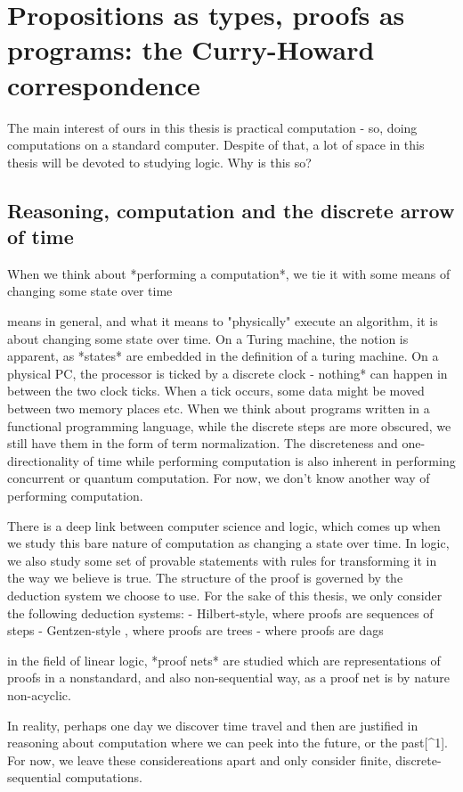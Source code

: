 \chapter{Propositions as types, proofs as programs: the Curry-Howard correspondence}
\label{chap:curry-howard}

The main interest of ours in this thesis is practical computation - so, doing computations
on a standard computer. Despite of that, a lot of space in this thesis will be devoted to 
studying logic. Why is this so?


\section{Reasoning, computation and the discrete arrow of time}
When we think about *performing a computation*, we tie it with some means of
changing some state over time

means in general, and what it
means to "physically" execute an algorithm, it is about changing some state over time.
On a Turing machine, the notion is apparent, as *states* are embedded in the definition of a turing machine.
On a physical PC, the processor is ticked by a discrete clock - nothing* can happen in between the two
clock ticks. When a tick occurs, some data might be moved between two memory places etc.
When we think about programs written in a functional programming language, while the discrete steps 
are more obscured, we still have them in the form of term normalization. The discreteness
and one-directionality of time while performing computation is also inherent in
performing concurrent or quantum computation. For now, we don't know another way of performing computation.

There is a deep link between computer science and logic, which comes up when we study this
bare nature of computation as changing a state over time. In logic, we also study some set
of provable statements with rules for transforming it in the way we believe is true.
The structure of the proof is governed by the deduction system we choose to use.
For the sake of this thesis, we only consider the following deduction systems:
- Hilbert-style, where proofs are sequences of steps
- Gentzen-style , where proofs are trees
- where proofs are dags

in the field of linear logic, *proof nets* are studied which are representations of proofs
in a nonstandard, and also non-sequential way, as a proof net is by nature non-acyclic.

In reality, perhaps one day we discover time travel and then are justified in reasoning about computation
where we can peek into the future, or the past[^1]. For now, we leave these considereations apart
and only consider finite, discrete-sequential computations.

